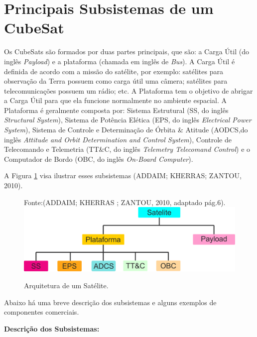 \section{Principais Subsistemas de um CubeSat}

Os CubeSats são formados por duas partes principais, que são: a Carga Útil (do inglês \textit{Payload}) e a plataforma (chamada em inglês de \textit{Bus}). A Carga Útil é definida de acordo com a missão do satélite, por exemplo: satélites para observação da Terra possuem como carga útil uma câmera; satélites para telecomunicações possuem um rádio; etc. A Plataforma tem o objetivo de abrigar a Carga Útil para que ela funcione normalmente no ambiente espacial. A Plataforma é geralmente composta por: Sistema Estrutural (SS, do inglês \textit{Structural System}), Sistema de Potência Elética (EPS, do inglês \textit{Electrical Power System}), Sistema de Controle e Determinação de Órbita \& Atitude (AODCS,do inglês \textit{Attitude and Orbit Determination and Control System}), Controle de Telecomando e Telemetria (TT\&C, do inglês \textit{Telemetry Telecomand Control}) e o Computador de Bordo (OBC, do inglês \textit{On-Board Computer}). 

A Figura \ref{fig06} visa ilustrar esses subsistemas (ADDAIM; KHERRAS; ZANTOU, 2010).

\begin{figure}[h]
	\centering
    Fonte:(ADDAIM; KHERRAS ; ZANTOU, 2010, adaptado pág.6).
	\includegraphics[keepaspectratio=true,scale=0.5]{figuras/estrutura_satellite.png}
	\caption{Arquitetura de um Satélite.}
	\label{fig06}
\end{figure}

\newpage

Abaixo há uma breve descrição dos subsistemas e alguns exemplos de componentes comerciais.

\textbf{Descrição dos Subsistemas:}

